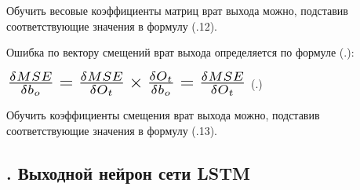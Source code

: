 {  \par \redline Обучить весовые коэффициенты матриц врат выхода можно, подставив соответствующие значения в формулу (\thechaptercntr .12).

  \par \redline Ошибка по вектору смещений врат выхода определяется по формуле (\thechaptercntr .\theformulacntr):

  \formulaspace \par \redline 
    $\scaleto{\frac{\delta MSE}{\delta b_o} = \frac{\delta MSE}{\delta O_t} \times \frac{\delta O_t}{\delta b_o} = \frac{\delta MSE}{\delta O_t}}{22pt}$
    \hfill (\thechaptercntr .\theformulacntr) \redline
  \formulaspace \addtocounter{formulacntr}{1}

  \par \redline Обучить коэффициенты смещения врат выхода можно, подставив соответствующие значения в формулу (\thechaptercntr .13).

  \par
}

\subtitlespace

\subsection*{ 
  \gostTitleFont
  \redline
  \thechaptercntr .\thesubchaptercntr \spc 
  Выходной нейрон сети LSTM
} \addtocounter{subchaptercntr}{1} 
  
\subtitlespace
  
